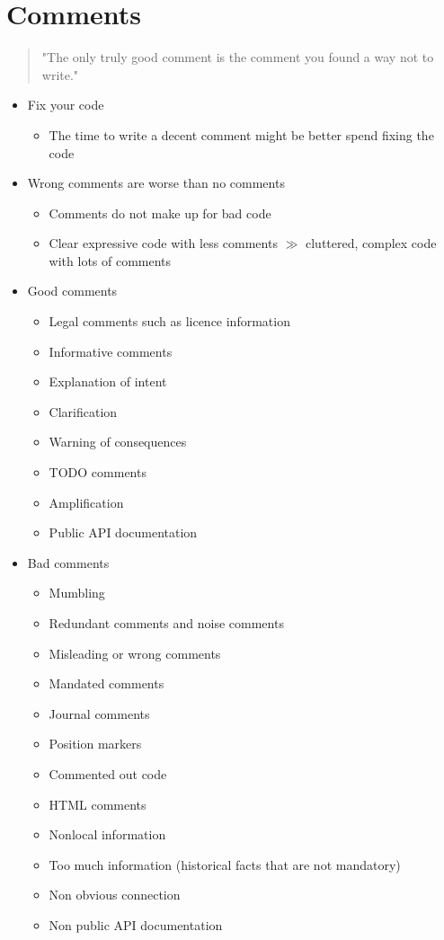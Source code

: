 
\section*{Comments}
\begin{quote}
    "The only truly good comment is the comment you found a way not to write."
\end{quote}
\begin{itemize}
    \item Fix your code
    \begin{itemize}
        \item The time to write a decent comment might be better spend fixing the code
    \end{itemize}
    \item Wrong comments are worse than no comments
    \begin{itemize}
        \item Comments do not make up for bad code
        \item Clear expressive code with less comments $\gg$ cluttered, complex code with lots of comments
    \end{itemize}
    \item Good comments
    \begin{itemize}
        \item Legal comments such as licence information
        \item Informative comments
        \item Explanation of intent
        \item Clarification
        \item Warning of consequences
        \item TODO comments
        \item Amplification
        \item Public API documentation
    \end{itemize}
    \item Bad comments
    \begin{itemize}
        \item Mumbling
        \item Redundant comments and noise comments
        \item Misleading or wrong comments
        \item Mandated comments
        \item Journal comments
        \item Position markers
        \item Commented out code
        \item HTML comments
        \item Nonlocal information
        \item Too much information (historical facts that are not mandatory)
        \item Non obvious connection
        \item Non public API documentation
    \end{itemize}
\end{itemize}